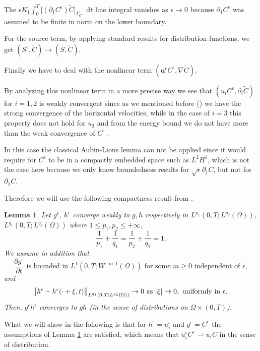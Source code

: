 \documentclass[11pt]{article}
\newtheorem{lemma}{Lemma}
\newcommand*\diff{\mathop{}\!\mathrm{d}}
\begin{document}
    The $\epsilon K_1 \int_0^T \big[(\partial_1 C^\epsilon) \tilde{C} \big] _{\Gamma_G} \diff t$ line integral vanishes as $\epsilon \to 0$ because $\partial_1 C^\epsilon$ was assumed to be finite in norm on the lower boundary.
      
    For the source term, by applying standard results for distribution functions, we get $(S^\epsilon, \tilde{C}) \to  (S, \tilde{C}).$ 
      
Finally we have to deal with the nonlinear term $(\mathbf{u}^\epsilon C^\epsilon, \nabla \tilde{C}).$
  
By analyzing this nonlinear term in a more precise way we see that $(u_i C^\epsilon, \partial_i \tilde{C})$ for $i=1,2$ is weakly convergent since as we mentioned before (\cite{azerad2001mathematical}) we have the strong convergence of the horizontal velocities, while in the case of $i=3$ this property does not hold for $u_3$ and from the energy bound we do not have more than the weak convergence of $C^\epsilon$ .
  
  In this case the classical Aubin-Lions lemma can not be applied since it would require for $C^\epsilon$ to be in a compactly embedded space such as $L^2 H^1$, which is not the case here because we only know boundedness results for $\sqrt{\epsilon} \partial_1 C$, but not for $\partial_1 C$.
  
   Therefore we will use the following compactness result from \cite{lions1996mathematical}.
  
  \begin{lemma} \label{PLL}
    Let $g^\epsilon$, $h^\epsilon$ converge weakly to $g,h$ respectively in $L^{p_1}(0,T; L^{p_2}(\Omega))$, $L^{q_1}(0,T; L^{q_2}(\Omega))$ where $1 \leq p_1, p_2 \leq + \infty,$
    \[ \frac{1}{p_1} + \frac{1}{q_1} =  \frac{1}{p_2} + \frac{1}{q_2} = 1. \]
    We assume in addition that
    $$\frac{\partial g^\epsilon}{\partial t} \text{ is bounded in } L^1 (0,T; W^{-m, 1} (\Omega)) \text{ for some } m \geq 0 \text{ independent of } \epsilon,$$
    and
    $$\norm{h^\epsilon - h^\epsilon(\cdot + \xi, t)}_{L^{q_1}(0,T; L^{q_2}(\Omega))} \to 0 \text{ as } \abs{\xi} \to 0, \text{ uniformly in } \epsilon.$$
    Then, $g^\epsilon h^\epsilon$ converges to $gh$ (in the sense of distributions on $\Omega \times (0,T)$).
  \end{lemma}
  
  What we will show in the following is that for $h^\epsilon = u^\epsilon_i$ and $g^\epsilon = C^\epsilon$ the assumptions of Lemma \ref{PLL} are satisfied, which means that $u_i^\epsilon C^\epsilon \rightharpoonup  u_i C$ in the sense of distribution.
   
\end{document}
